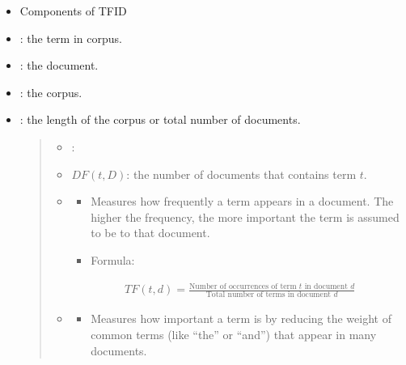 \documentclass[letterpaper,11pt,english]{sphinxmanual}
\begin{document}
\begin{itemize}
\item {} 
\sphinxAtStartPar
Components of TF\sphinxhyphen{}ID

\item {} 
\sphinxAtStartPar
{}: the term in corpus.

\item {} 
\sphinxAtStartPar
{}: the document.

\item {} 
\sphinxAtStartPar
{}: the corpus.

\item {} 
\sphinxAtStartPar
{}: the length of the corpus or total number of documents.
\begin{quote}
\begin{itemize}
\item {} 
\sphinxAtStartPar
{}:

\item {} 
\sphinxAtStartPar
\(DF(t,D)\): the number of documents that contains term \(t\).

\item {} \begin{description}
\begin{itemize}
\item {} 
\sphinxAtStartPar
Measures how frequently a term appears in a document. The higher the frequency, the more important the term is assumed to be to that document.

\item {} 
\sphinxAtStartPar
Formula:

\end{itemize}
\begin{equation*}
\begin{split}TF(t, d) = \frac{\text{Number of occurrences of term } t \text{ in document } d}{\text{Total number of terms in document } d}\end{split}
\end{equation*}
\end{description}

\item {} \begin{description}
\begin{itemize}
\item {} 
\sphinxAtStartPar
Measures how important a term is by reducing the weight of common terms (like “the” or “and”) that appear in many documents.


\end{itemize}
\end{description}
\end{itemize}
\end{quote}
\end{itemize}
\end{document}
